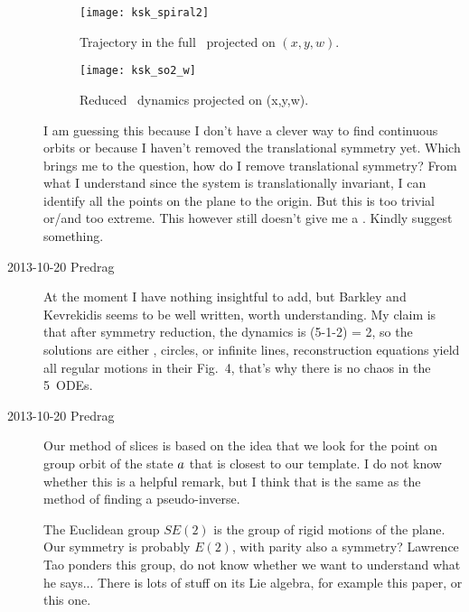 \begin{description}
\begin{figure}[b]
\begin{center}
\texttt{[image: ksk\_spiral2]}
\end{center}
\caption{ Trajectory in the full \statesp\ projected on $(x,y,w)$.
    }
\label{fig:ksk_spiral2}
\end{figure}

\begin{figure}[ht]
\begin{center}
\texttt{[image: ksk\_so2\_w]}
\end{center}
\caption{ Reduced \statesp\ dynamics projected on (x,y,w).
    }
\label{fig:ksk_so2_w}
\end{figure}

I am guessing this because I don't have a clever way to find
continuous orbits or because I haven't removed the translational
symmetry yet. Which brings me to the question, how do I remove
translational symmetry? From what I understand since the system is
translationally invariant, I can identify all the points on the plane
to the origin. But this is too trivial or/and too extreme. This
however still doesn't give me a \rpo.
Kindly suggest something.

\item[2013-10-20 Predrag] At the moment I have nothing insightful to add,
but Barkley and Kevrekidis seems to be well written, worth
understanding. My claim is that after symmetry reduction, the dynamics is
(5-1-2) = 2\dmn, so the solutions are either \eqva, circles, or infinite
lines, reconstruction equations yield all regular motions in
their Fig.~4, that's why there is no chaos in the 5\dmn\ ODEs.

\item[2013-10-20 Predrag] Our method of slices is based on the idea that
we look for the point on group orbit of the state $a$ that is closest
to our template. I do not know whether this is a helpful remark, but
I think that is the same as the method of finding a
{pseudo-inverse}.

The Euclidean group $SE(2)$ is the group of rigid motions of the plane.
Our symmetry is probably $E(2)$, with parity also a symmetry? Lawrence Tao
ponders
{this group}, do not know whether we want to understand what he says...
There is lots of stuff on its Lie algebra, for example
{this paper}, or
{this one}.


\end{description}

